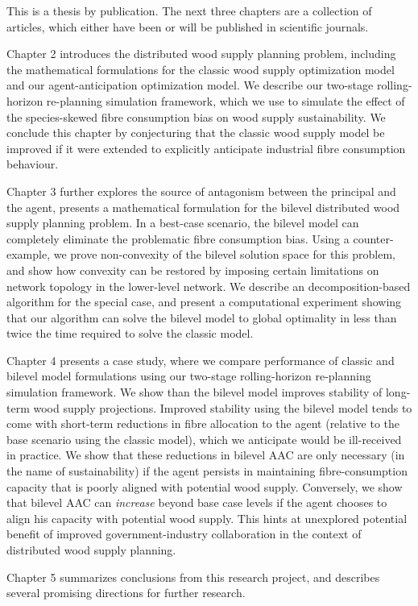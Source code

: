 This is a thesis by publication. The next three chapters are a collection of articles, which either have been or will be published in scientific journals. 

Chapter 2 introduces the distributed wood supply planning problem, including the mathematical formulations for the classic wood supply optimization model and our agent-anticipation optimization model. We describe our two-stage rolling-horizon re-planning simulation framework, which we use to simulate the effect of the species-skewed fibre consumption bias on wood supply sustainability. We conclude this chapter by conjecturing that the classic wood supply model be improved if it were extended to explicitly anticipate industrial fibre consumption behaviour.

Chapter 3 further explores the source of antagonism between the principal and the agent, presents a mathematical formulation for the bilevel distributed wood supply planning problem. In a best-case scenario, the bilevel model can completely eliminate the problematic fibre consumption bias. Using a counter-example, we prove non-convexity of the bilevel solution space for this problem, and show how convexity can be restored by imposing certain limitations on network topology in the lower-level network. We describe an decomposition-based algorithm for the special case, and present a computational experiment showing that our algorithm can solve the bilevel model to global optimality in less than twice the time required to solve the classic model.

Chapter 4 presents a case study, where we compare performance of classic and bilevel model formulations using our two-stage rolling-horizon re-planning simulation framework. We show than the bilevel model improves stability of long-term wood supply projections. Improved stability using the bilevel model tends to come with short-term reductions in fibre allocation to the agent (relative to the base scenario using the classic model), which we anticipate would be ill-received in practice. We show that these reductions in bilevel AAC are only necessary (in the name of sustainability) if the agent persists in maintaining fibre-consumption capacity that is poorly aligned with potential wood supply. Conversely, we show that bilevel AAC can \emph{increase} beyond base case levels if the agent chooses to align his capacity with potential wood supply. This hints at unexplored potential benefit of improved government-industry collaboration in the context of distributed wood supply planning.

Chapter 5 summarizes conclusions from this research project, and describes several promising directions for further research.

%
%  



